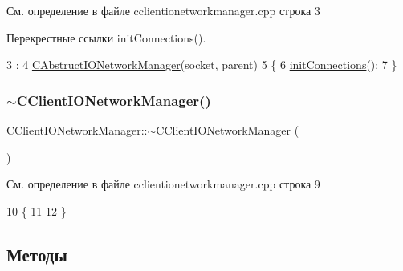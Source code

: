 См. определение в файле cclientionetworkmanager.\+cpp строка 3



Перекрестные ссылки init\+Connections().


\begin{DoxyCode}
3                                                                                    :
4     \hyperlink{class_c_abstruct_i_o_network_manager_a4ed201a3712ddf4ccd2135a0eb40fbf2}{CAbstructIONetworkManager}(socket, parent)
5 \{
6     \hyperlink{class_c_client_i_o_network_manager_aeb1564c209ae8b790cf799075cfa6a98}{initConnections}();
7 \}
\end{DoxyCode}
\hypertarget{class_c_client_i_o_network_manager_aaaeddd1337640480b4eae0418cee6026}{}\label{class_c_client_i_o_network_manager_aaaeddd1337640480b4eae0418cee6026} 
\subsubsection{\texorpdfstring{$\sim$\+C\+Client\+I\+O\+Network\+Manager()}{~CClientIONetworkManager()}}
{\footnotesize\ttfamily C\+Client\+I\+O\+Network\+Manager\+::$\sim$\+C\+Client\+I\+O\+Network\+Manager (\begin{DoxyParamCaption}{ }\end{DoxyParamCaption})\hspace{0.3cm}{\ttfamily [virtual]}}



См. определение в файле cclientionetworkmanager.\+cpp строка 9


\begin{DoxyCode}
10 \{
11 
12 \}
\end{DoxyCode}


\subsection{Методы}
\hypertarget{class_c_client_i_o_network_manager_aaa7b77037603697d3bee7daed467b092}{}\label{class_c_client_i_o_network_manager_aaa7b77037603697d3bee7daed467b092} 
